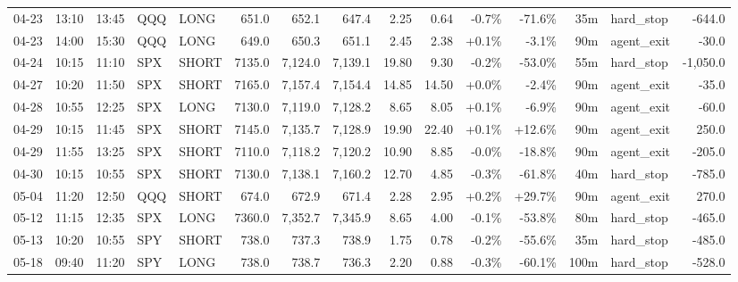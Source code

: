 \documentclass[11pt,a4paper,twoside]{article}
\begin{document}
\begin{landscape}
\begin{center}
\begin{longtable}{>{\color{txtmain}}l l l l l r r r r r r r r >{\color{txtmain}}l r}
04-23 & 13:10 & 13:45 & QQQ & LONG & 651.0 & 652.1 & 647.4 & 2.25 & 0.64 & \textcolor{lossred}{-0.7\%} & \textcolor{lossred}{-71.6\%} & 35m & hard\_stop & \textcolor{lossred}{-644.0} \\
04-23 & 14:00 & 15:30 & QQQ & LONG & 649.0 & 650.3 & 651.1 & 2.45 & 2.38 & \textcolor{wingreen}{+0.1\%} & \textcolor{lossred}{-3.1\%} & 90m & agent\_exit & \textcolor{lossred}{-30.0} \\
04-24 & 10:15 & 11:10 & SPX & SHORT & 7135.0 & 7,124.0 & 7,139.1 & 19.80 & 9.30 & \textcolor{lossred}{-0.2\%} & \textcolor{lossred}{-53.0\%} & 55m & hard\_stop & \textcolor{lossred}{-1,050.0} \\
04-27 & 10:20 & 11:50 & SPX & SHORT & 7165.0 & 7,157.4 & 7,154.4 & 14.85 & 14.50 & \textcolor{wingreen}{+0.0\%} & \textcolor{lossred}{-2.4\%} & 90m & agent\_exit & \textcolor{lossred}{-35.0} \\
04-28 & 10:55 & 12:25 & SPX & LONG & 7130.0 & 7,119.0 & 7,128.2 & 8.65 & 8.05 & \textcolor{wingreen}{+0.1\%} & \textcolor{lossred}{-6.9\%} & 90m & agent\_exit & \textcolor{lossred}{-60.0} \\
04-29 & 10:15 & 11:45 & SPX & SHORT & 7145.0 & 7,135.7 & 7,128.9 & 19.90 & 22.40 & \textcolor{wingreen}{+0.1\%} & \textcolor{wingreen}{+12.6\%} & 90m & agent\_exit & \textcolor{wingreen}{250.0} \\
04-29 & 11:55 & 13:25 & SPX & SHORT & 7110.0 & 7,118.2 & 7,120.2 & 10.90 & 8.85 & \textcolor{lossred}{-0.0\%} & \textcolor{lossred}{-18.8\%} & 90m & agent\_exit & \textcolor{lossred}{-205.0} \\
04-30 & 10:15 & 10:55 & SPX & SHORT & 7130.0 & 7,138.1 & 7,160.2 & 12.70 & 4.85 & \textcolor{lossred}{-0.3\%} & \textcolor{lossred}{-61.8\%} & 40m & hard\_stop & \textcolor{lossred}{-785.0} \\
05-04 & 11:20 & 12:50 & QQQ & SHORT & 674.0 & 672.9 & 671.4 & 2.28 & 2.95 & \textcolor{wingreen}{+0.2\%} & \textcolor{wingreen}{+29.7\%} & 90m & agent\_exit & \textcolor{wingreen}{270.0} \\
05-12 & 11:15 & 12:35 & SPX & LONG & 7360.0 & 7,352.7 & 7,345.9 & 8.65 & 4.00 & \textcolor{lossred}{-0.1\%} & \textcolor{lossred}{-53.8\%} & 80m & hard\_stop & \textcolor{lossred}{-465.0} \\
05-13 & 10:20 & 10:55 & SPY & SHORT & 738.0 & 737.3 & 738.9 & 1.75 & 0.78 & \textcolor{lossred}{-0.2\%} & \textcolor{lossred}{-55.6\%} & 35m & hard\_stop & \textcolor{lossred}{-485.0} \\
05-18 & 09:40 & 11:20 & SPY & LONG & 738.0 & 738.7 & 736.3 & 2.20 & 0.88 & \textcolor{lossred}{-0.3\%} & \textcolor{lossred}{-60.1\%} & 100m & hard\_stop & \textcolor{lossred}{-528.0} \\

\end{longtable}
\end{center}
\end{landscape}
\end{document}
